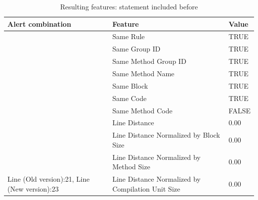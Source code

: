 \documentclass[
]{article}
\begin{document}
\begin{table}[!h]

\caption{\label{tab:unnamed-chunk-11}Resulting features: statement included before \label{include_statement_before} }
\centering
\begin{tabular}[t]{l|l|l}
\hline
Alert combination & Feature & Value\\
\hline
\rowcolor{gray!6}   & Same Rule & TRUE\\

 & Same Group ID & TRUE\\

\rowcolor{gray!6}   & Same Method Group ID & TRUE\\

 & Same Method Name & TRUE\\

\rowcolor{gray!6}   & Same Block & TRUE\\

 & Same Code & TRUE\\

\rowcolor{gray!6}   & Same Method Code & FALSE\\

 & Line Distance & 0.00\\

\rowcolor{gray!6}   & Line Distance Normalized by Block Size & 0.00\\

 & Line Distance Normalized by Method Size & 0.00\\

\multirow[t]{-11}{*}{\raggedright\arraybackslash Line (Old version):21, Line (New version):23} & Line Distance Normalized by Compilation Unit Size & 0.00\\
\hline
\end{tabular}
\end{table}

\normalsize

\newpage
\end{document}
